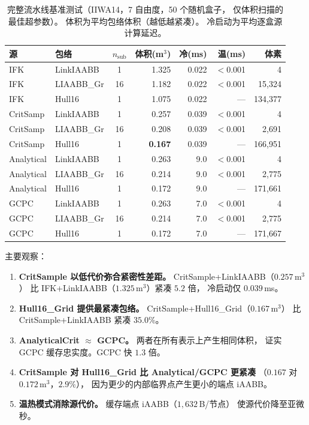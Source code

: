 \documentclass[journal]{IEEEtran}
\begin{document}
\begin{table}[t]
\centering
\caption{完整流水线基准测试（IIWA14，7 自由度，50 个随机盒子，
仅体积扫描的最佳超参数）。
体积为平均包络体积（越低越紧凑）。
冷启动为平均逐盒源计算延迟。}
\label{tab:pipeline}
\setlength{\tabcolsep}{2.0pt}
\small
\begin{tabular}{@{}llcrrrr@{}}
\toprule
源 & 包络 & $n_\text{sub}$
  & \!\!体积(m$^3$)\!\! & \!冷(ms)\! & \!温(ms)\! & 体素 \\
\midrule
IFK          & LinkIAABB   &  1 & 1.325 &   0.022 & $<$0.001 & 4 \\
IFK          & LIAABB\_Gr  & 16 & 1.182 &   0.022 &  $<$0.001 & 15{,}324 \\
IFK          & Hull16      &  1 & 1.075 &   0.022 &  --- & 134{,}377 \\
\midrule
CritSamp     & LinkIAABB   &  1 & 0.257 &   0.039 & $<$0.001 & 4 \\
CritSamp     & LIAABB\_Gr  & 16 & 0.208 &   0.039 &  $<$0.001 & 2{,}691 \\
CritSamp     & Hull16      &  1 & \textbf{0.167} &   0.039 &  --- & 166{,}951 \\
\midrule
Analytical   & LinkIAABB   &  1 & 0.263 &   9.0\phantom{00}  & $<$0.001 & 4 \\
Analytical   & LIAABB\_Gr  & 16 & 0.214 &   9.0\phantom{00}  &  $<$0.001 & 2{,}775 \\
Analytical   & Hull16      &  1 & 0.172 &   9.0\phantom{00}  &  --- & 171{,}661 \\
\midrule
GCPC         & LinkIAABB   &  1 & 0.263 &   7.0\phantom{00}  & $<$0.001 & 4 \\
GCPC         & LIAABB\_Gr  & 16 & 0.214 &   7.0\phantom{00}  &  $<$0.001 & 2{,}775 \\
GCPC         & Hull16      &  1 & 0.172 &   7.0\phantom{00}  &  --- & 171{,}667 \\
\bottomrule
\end{tabular}
\end{table}

主要观察：
\begin{enumerate}
\item \textbf{CritSample 以低代价弥合紧密性差距。}
  CritSample+LinkIAABB（$0.257$\,m$^3$）
  比 IFK+LinkIAABB（$1.325$\,m$^3$）紧凑 $5.2$ 倍，
  冷启动仅 $0.039$\,ms。

\item \textbf{Hull16\_Grid 提供最紧凑包络。}
  CritSample+Hull16\_Grid（$0.167$\,m$^3$）
  比 CritSample+LinkIAABB 紧凑 $35.0\%$。

\item \textbf{AnalyticalCrit $\approx$ GCPC。}
  两者在所有表示上产生相同体积，
  证实 GCPC 缓存忠实度。GCPC 快 $1.3$ 倍。

\item \textbf{CritSample 对 Hull16\_Grid 比 Analytical/GCPC 更紧凑}
  （$0.167$ 对 $0.172$\,m$^3$，$2.9\%$），
  因为更少的内部临界点产生更小的端点 iAABB。

\item \textbf{温热模式消除源代价。}
  缓存端点 iAABB（$1{,}632$\,B/节点）
  使源代价降至亚微秒。
\end{enumerate}
\end{document}
